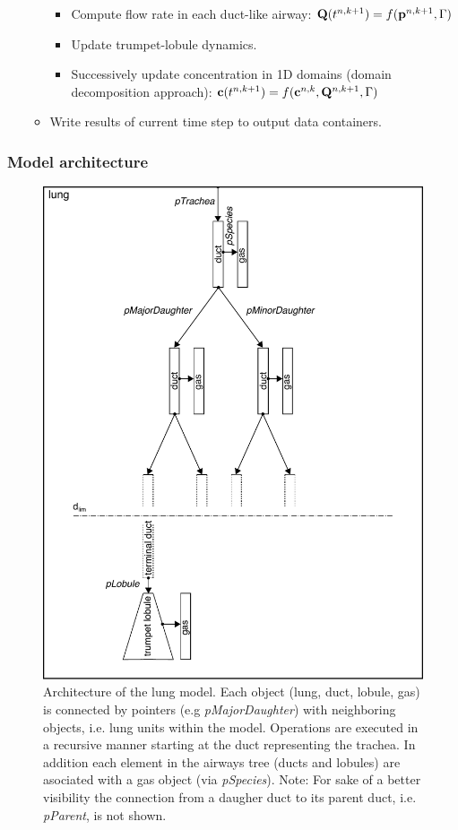 \begin{itemize}
\begin{itemize}
\begin{itemize}
      \item Compute flow rate in each duct-like airway: $\mathbf{Q}(t^{n, k+1}) = f(\mathbf{p}^{n, k+1}, \Gamma)$
      \item Update trumpet-lobule dynamics.
      \item Successively update concentration in 1D domains (domain decomposition approach): $\mathbf{c}(t^{n, k+1}) = f(\mathbf{c}^{n, k}, \mathbf{Q}^{n, k+1}, \Gamma)$
    \end{itemize}
    \item Write results of current time step to output data containers.
  \end{itemize}
\end{itemize}


\subsubsection{Model architecture}
\begin{figure}[tb!]
\centering
\includegraphics[width=\textwidth]{figures/model_architecture}
\caption{Architecture of the lung model. Each object (lung, duct, lobule, gas) is connected by pointers (e.g \textit{pMajorDaughter}) with neighboring objects, i.e. lung units within the model. Operations are executed in a recursive manner starting at the duct representing the trachea. In addition each element in the airways tree (ducts and lobules) are asociated with a gas object (via \textit{pSpecies}). Note: For sake of a better visibility the connection from a daugher duct to its parent duct, i.e. \textit{pParent}, is not shown.}
\label{fig:model_architecture}
\end{figure}

